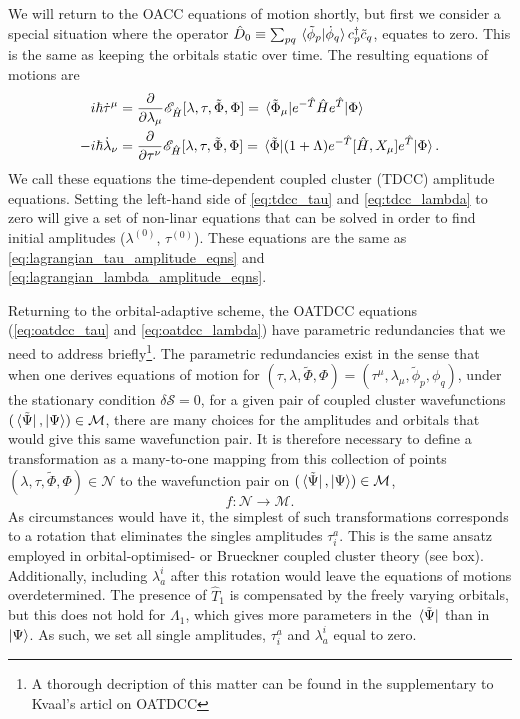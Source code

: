 We will return to the OACC equations of motion shortly, but first we consider a special 
situation where the operator
$\hat{D}_0 \equiv \sum_{pq} \braket*{\tilde{\phi}_p}{\dot{\phi}_q}c^\dagger_p\tilde{c}_q$,
equates to zero. This is the same as keeping the orbitals static over time. The 
resulting equations of motions are 
\begin{align}
    \label{eq:tdcc_tau}
    i\hbar\dot{\tau}^\mu 
        &= \frac{\partial}{\partial \lambda_\mu}\mathscr{E}_{\hat{H}}
            [\lambda, \tau, \tilde{\Phi}, \Phi]
        = \mel*{\tilde{\Phi}_\mu}
            {e^{-\hat{T}}\hat{H}e^{\hat{T}}}
        {\Phi} \\
    \label{eq:tdcc_lambda}
    -i\hbar\dot{\lambda}_\nu
        &= \frac{\partial}{\partial \tau^\nu}\mathscr{E}_{\hat{H}}
            [\lambda, \tau, \tilde{\Phi}, \Phi]
        = \mel*{\tilde{\Phi}}
            {(1 + \Lambda)e^{-\hat{T}}[\hat{H}, X_\mu]e^{\hat{T}}}
        {\Phi}.
\end{align}
We call these equations the time-dependent coupled cluster (TDCC) amplitude equations. 
Setting the left-hand side of
\autoref{eq:tdcc_tau} and \autoref{eq:tdcc_lambda} to zero will give a set of 
non-linar equations that can be solved in order to find initial amplitudes 
($\lambda^{(0)}$, $\tau^{(0)}$). These equations are the same as 
\autoref{eq:lagrangian_tau_amplitude_eqns} and \autoref{eq:lagrangian_lambda_amplitude_eqns}.

Returning to the orbital-adaptive scheme, the OATDCC equations 
(\autoref{eq:oatdcc_tau} and \autoref{eq:oatdcc_lambda}) have parametric redundancies
that we need to address briefly\footnote{A thorough decription of this matter can be 
found in the supplementary to Kvaal's articl on OATDCC\cite{kvaal2012ab}}. The 
parametric redundancies exist in the sense that when one derives equations of motion
for 
$(\tau, \lambda, \tilde{\Phi}, \Phi) = (\tau^\mu, \lambda_\mu, \tilde{\phi}_p, \phi_q)$,
under the stationary condition
$\delta\mathcal{S} = 0$, for a given pair of coupled cluster wavefunctions
$(\bra*{\tilde{\Psi}}, \ket{\Psi}) \in \mathcal{M}$, there are many choices for the amplitudes and 
orbitals that would give this same wavefunction pair. It is therefore necessary 
to define a transformation as a many-to-one mapping from this collection of points
$(\lambda, \tau, \tilde{\Phi}, \Phi) \in \mathcal{N}$
to the wavefunction pair on $(\bra*{\tilde{\Psi}}, \ket{\Psi}) \in \mathcal{M}$,
\begin{equation}
   f : \mathcal{N} \to \mathcal{M}. 
\end{equation}
As circumstances would have it, the simplest of such transformations corresponds to 
a rotation that eliminates the singles amplitudes $\tau^a_i$. This is the same ansatz 
employed in orbital-optimised-  or Brueckner coupled cluster theory (see box). Additionally,
including $\lambda^i_a$ after this rotation would leave the equations of motions 
overdetermined. The presence of $\hat{T}_1$ is compensated by the freely 
varying orbitals, but this does not hold for $\Lambda_1$, which gives more 
parameters in the $\bra*{\tilde{\Psi}}$ than in $\ket{\Psi}$. As such, we set all 
single amplitudes, $\tau^a_i$ and $\lambda^i_a$ equal to zero.


